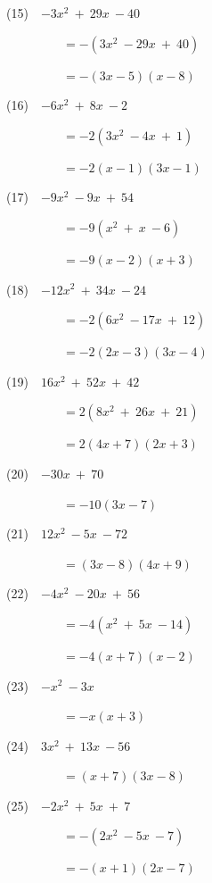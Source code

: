 \documentclass[a4j,twocolumn,10pt,fleqn]{jarticle}
\begin{document}
(15)~~$-3x^2~+~29x~-40$

~~~~~~~~~$=-(3x^2~-29x~+~40)$

~~~~~~~~~$=-(3x-5)(x-8)$

(16)~~$-6x^2~+~8x~-2$

~~~~~~~~~$=-2(3x^2~-4x~+~1)$

~~~~~~~~~$=-2(x-1)(3x-1)$

(17)~~$-9x^2~-9x~+~54$

~~~~~~~~~$=-9(x^2~+~x~-6)$

~~~~~~~~~$=-9(x-2)(x+3)$

(18)~~$-12x^2~+~34x~-24$

~~~~~~~~~$=-2(6x^2~-17x~+~12)$

~~~~~~~~~$=-2(2x-3)(3x-4)$

(19)~~$16x^2~+~52x~+~42$

~~~~~~~~~$=2(8x^2~+~26x~+~21)$

~~~~~~~~~$=2(4x+7)(2x+3)$

(20)~~$-30x~+~70$

~~~~~~~~~$=-10(3x-7)$

(21)~~$12x^2~-5x~-72$

~~~~~~~~~$=(3x-8)(4x+9)$

(22)~~$-4x^2~-20x~+~56$

~~~~~~~~~$=-4(x^2~+~5x~-14)$

~~~~~~~~~$=-4(x+7)(x-2)$

(23)~~$-x^2~-3x$

~~~~~~~~~$=-x(x+3)$

(24)~~$3x^2~+~13x~-56$

~~~~~~~~~$=(x+7)(3x-8)$

(25)~~$-2x^2~+~5x~+~7$

~~~~~~~~~$=-(2x^2~-5x~-7)$

~~~~~~~~~$=-(x+1)(2x-7)$
\end{document}
